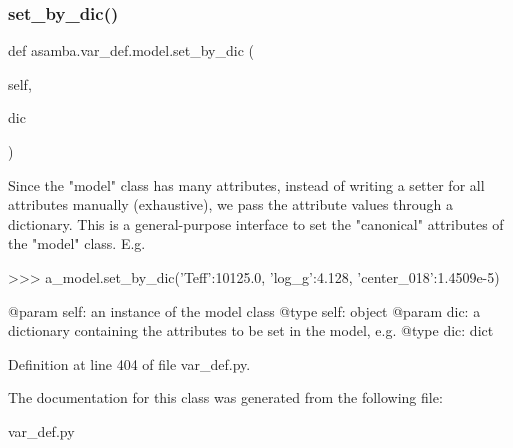 \subsubsection{\texorpdfstring{set\+\_\+by\+\_\+dic()}{set\_by\_dic()}}
{\footnotesize\ttfamily def asamba.\+var\+\_\+def.\+model.\+set\+\_\+by\+\_\+dic (\begin{DoxyParamCaption}\item[{}]{self,  }\item[{}]{dic }\end{DoxyParamCaption})}

\begin{DoxyVerb}Since the "model" class has many attributes, instead of writing a setter for all 
attributes manually (exhaustive), we pass the attribute values through a dictionary.
This is a general-purpose interface to set the "canonical" attributes of the "model"
class. E.g. 

>>> a_model.set_by_dic({'Teff':10125.0, 'log_g':4.128, 'center_018':1.4509e-5})

@param self: an instance of the model class
@type self: object
@param dic: a dictionary containing the attributes to be set in the model, e.g.
@type dic: dict
\end{DoxyVerb}
 

Definition at line 404 of file var\+\_\+def.\+py.



The documentation for this class was generated from the following file\+:\begin{DoxyCompactItemize}
\item 
var\+\_\+def.\+py\end{DoxyCompactItemize}
